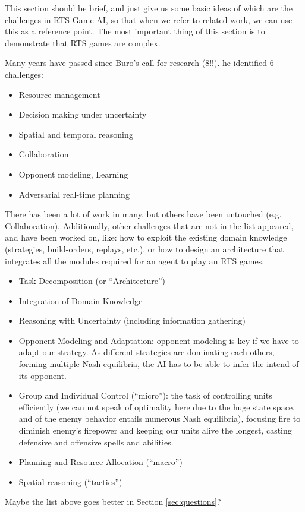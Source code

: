 \documentclass[journal]{IEEEtran}
\begin{document}
{\color{blue}
This section should be brief, and just give us some basic ideas of which are the challenges in RTS Game AI, so that when we refer to related work, we can use this as a reference point.  The most important thing of this section is to demonstrate that RTS games are complex.

Many years have passed since Buro's call for research (8!!). he identified 6 challenges:
\begin{itemize}
\item Resource management
\item Decision making under uncertainty
\item Spatial and temporal reasoning
\item Collaboration
\item Opponent modeling, Learning
\item Adversarial real-time planning
\end{itemize}

There has been a lot of work in many, but others have been untouched (e.g. Collaboration). Additionally, other challenges that are not in the list appeared, and have been worked on, like: how to exploit the existing domain knowledge (strategies, build-orders, replays, etc.), or how to design an architecture that integrates all the modules required for an agent to play an RTS games. 

\begin{itemize}
\item Task Decomposition (or ``Architecture'')
\item Integration of Domain Knowledge
\item Reasoning with Uncertainty (including information gathering)
\item Opponent Modeling and Adaptation: opponent modeling is key if we have to adapt our strategy. As different strategies are dominating each others, forming multiple Nash equilibria, the AI has to be able to infer the intend of its opponent.
\item Group and Individual Control (``micro''): the task of controlling units efficiently (we can not speak of optimality here due to the huge state space, and of the enemy behavior entails numerous Nash equilibria), focusing fire to diminish enemy's firepower and keeping our units alive the longest, casting defensive and offensive spells and abilities.
\item Planning and Resource Allocation (``macro'')
\item Spatial reasoning (``tactics'')
\end{itemize}

Maybe the list above goes better in Section \ref{sec:questions}?
}
\end{document}
